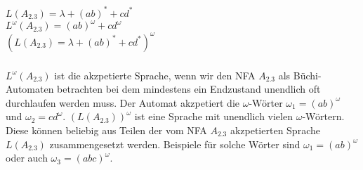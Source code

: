 \documentclass[a4paper,12pt]{scrartcl}
\title{\blatt}
\date{Gruppe 06}
\author{Sabrina Buczko 6663234, Julian Deinert 6535880, Rafael Heid 6704828}
\begin{document}
\maketitle
\newpage
\setcounter{section}{1}
\section{}
\setcounter{subsection}{2}
\subsection{}
\subsubsection{}
$L(A_{2.3})=\lambda+(ab)^*+cd^*$\\
$L^\omega(A_{2.3}) = (ab)^\omega + cd^\omega$\\
$(L(A_{2.3})=\lambda+(ab)^*+cd^*)^\omega$
\subsubsection{}
$L^\omega(A_{2.3})$ ist die akzpetierte Sprache, wenn wir den NFA $A_{2.3}$ als Büchi-Automaten betrachten bei dem mindestens ein Endzustand unendlich oft durchlaufen werden muss. Der Automat akzpetiert die $\omega$-Wörter $\omega_1 = (ab)^\omega$ und $\omega_2 = cd^\omega$. $(L(A_{2.3}))^\omega$ ist eine Sprache mit unendlich vielen $\omega$-Wörtern. Diese können beliebig aus Teilen der vom NFA $A_{2.3}$ akzpetierten Sprache $L(A_{2.3})$ zusammengesetzt werden. Beispiele für solche Wörter sind $\omega_1 = (ab)^\omega$ oder auch $\omega_3 = (abc)^\omega$.
\end{document}
